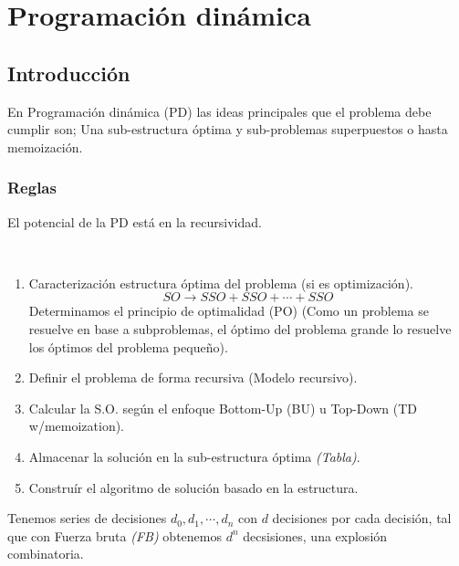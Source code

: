 \chapter{Programación dinámica}
\section{Introducción}

En Programación dinámica (PD) las ideas principales que el problema debe cumplir son; Una sub-estructura óptima y sub-problemas superpuestos o hasta memoización.

\subsection{Reglas}
El potencial de la PD está en la recursividad.
\begin{definition}~
	\begin{enumerate}
		\item Caracterización estructura óptima del problema (si es optimización).
		      $$ SO\to SSO+SSO+\cdots+SSO $$
		      Determinamos el principio de optimalidad (PO) (Como un problema se resuelve en base a subproblemas, el óptimo del problema grande lo resuelve los óptimos del problema pequeño).
		\item  Definir el problema de forma recursiva (Modelo recursivo).
		\item  Calcular la S.O. según el enfoque Bottom-Up (BU) u Top-Down (TD w/memoization).
		\item  Almacenar la solución en la sub-estructura óptima \textit{(Tabla)}.
		\item  Construír el algoritmo de solución basado en la estructura.
	\end{enumerate}
\end{definition}

Tenemos series de decisiones $d_0,d_1,\cdots,d_n$ con $d$ decisiones por cada decisión, tal que con Fuerza bruta \textit{(FB)} obtenemos $d^n$ decsisiones, una explosión combinatoria.

